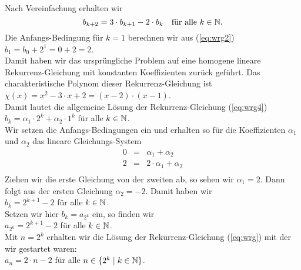 Nach Vereinfachung erhalten wir 
\begin{equation}
  \label{eq:wrg4}
  b_{k+2} = 3 \cdot b_{k+1} - 2 \cdot b_k \quad \mbox{f\"ur alle $k \in {\mathbb N}$.}
\end{equation}
Die Anfangs-Bedingung f\"ur $k=1$ berechnen wir aus (\ref{eq:wrg2}) \\[0.1cm]
\hspace*{1.3cm} $b_1 = b_0 + 2^{1} = 0 + 2 = 2$. \\[0.1cm]
Damit haben wir das urspr\"ungliche Problem auf eine homogene lineare Rekurrenz-Gleichung
mit konstanten Koeffizienten zur\"uck gef\"uhrt.  Das charakteristische Polynom dieser
Rekurrenz-Gleichung ist \\[0.1cm]
\hspace*{1.3cm} $\chi(x) = x^2 - 3\cdot x + 2 = (x-2)\cdot(x-1)$. \\[0.1cm]
Damit lautet die allgemeine L\"osung der Rekurrenz-Gleichung (\ref{eq:wrg4}) \\[0.1cm]
\hspace*{1.3cm} $b_k = \alpha_1 \cdot 2^k + \alpha_2 \cdot 1^k$ \quad f\"ur alle $k \in {\mathbb N}$. \\[0.1cm]
Wir setzen die Anfangs-Bedingungen ein und erhalten so f\"ur die Koeffizienten $\alpha_1$
und $\alpha_2$ das lineare Gleichungs-System 
\[
\begin{array}{lcl}
  0 & = & \alpha_1 + \alpha_2 \\
  2 & = & 2 \cdot \alpha_1 + \alpha_2 \\
\end{array}
\]
Ziehen wir die erste Gleichung von der zweiten ab, so sehen wir $\alpha_1 = 2$.  Dann
folgt aus der ersten Gleichung $\alpha_2 = -2$.  Damit haben wir \\[0.1cm]
\hspace*{1.3cm} $b_k = 2^{k+1} - 2$ \quad f\"ur alle $k \in {\mathbb N}$. \\[0.1cm]
Setzen wir hier $b_k = a_{2^k}$ ein, so finden wir \\[0.1cm]
\hspace*{1.3cm} $a_{2^k} = 2^{k+1} - 2$ \quad f\"ur alle $k \in {\mathbb N}$. \\[0.1cm]
Mit $n = 2^k$ erhalten wir die L\"osung der Rekurrenz-Gleichung (\ref{eq:wrg}) mit der wir 
gestartet waren: \\[0.1cm]
\hspace*{1.3cm} $a_n = 2 \cdot n - 2$ \quad f\"ur alle $n \in \{ 2^k \mid k \in {\mathbb N}\}$.  
\vspace*{0.3cm}

